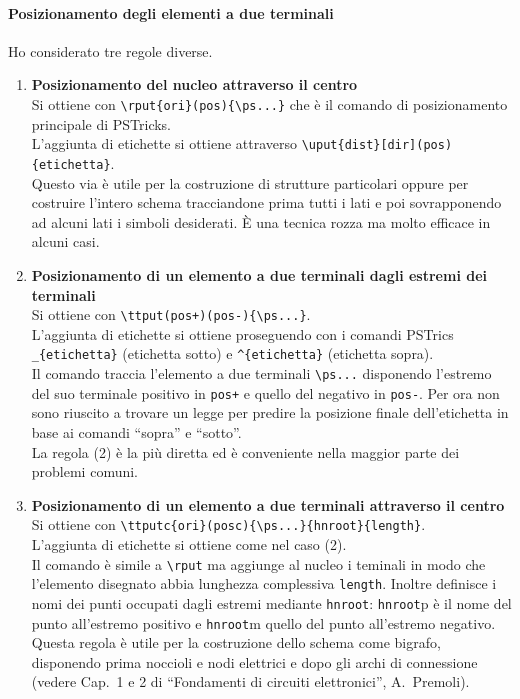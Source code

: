 \documentclass[12pt,a4paper]{articolo}
\begin{document}
\paragraph{Posizionamento degli elementi a due terminali}
Ho considerato tre regole diverse.
\begin{enumerate}

\item
\textbf{Posizionamento del nucleo attraverso il centro}\\
Si ottiene con \verb"\rput{ori}(pos){\ps...}" che \`e il comando di posizionamento principale di PSTricks.\\
L'aggiunta di etichette si ottiene attraverso \verb"\uput{dist}[dir](pos){etichetta}".\\
Questo via \`e utile per la costruzione di strutture particolari oppure per costruire l'intero schema tracciandone prima tutti i lati e poi sovrapponendo ad alcuni lati i simboli desiderati.
\`E una tecnica rozza ma molto efficace in alcuni casi.

\item
\textbf{Posizionamento di un elemento a due terminali dagli estremi dei terminali}\\
Si ottiene con \verb"\ttput(pos+)(pos-){\ps...}".\\
L'aggiunta di etichette si ottiene proseguendo con i comandi PSTrics \verb"_{etichetta}" (etichetta sotto) e \verb"^{etichetta}" (etichetta sopra).\\
Il comando traccia l'elemento a due terminali \verb"\ps..." disponendo l'estremo del suo terminale positivo in \verb"pos+" e quello del negativo in \verb"pos-". Per ora non sono riuscito a trovare un legge per predire la posizione finale dell'etichetta in base ai comandi ``sopra'' e ``sotto''.\\
La regola (2) \`e la pi\`u diretta ed \`e conveniente nella maggior parte dei problemi comuni.

\item
\textbf{Posizionamento di un elemento a due terminali attraverso il centro}\\
Si ottiene con \verb"\ttputc{ori}(posc){\ps...}{hnroot}{length}".\\
L'aggiunta di etichette si ottiene come nel caso (2).\\
Il comando \`e simile a \verb"\rput" ma aggiunge al nucleo i teminali in modo che l'elemento disegnato abbia lunghezza complessiva \verb"length".
Inoltre definisce i nomi dei punti occupati dagli estremi mediante
\verb"hnroot": \verb"hnroot"p \`e il nome del punto all'estremo positivo e \verb"hnroot"m quello del punto all'estremo negativo.\\
Questa regola \`e utile per la costruzione dello schema come bigrafo, disponendo prima noccioli e nodi elettrici e dopo gli archi di connessione (vedere Cap.~1 e 2 di ``Fondamenti di circuiti elettronici'', A.~Premoli).

\end{enumerate}
\end{document}
